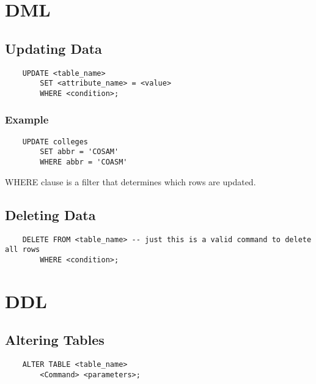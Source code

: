 \documentclass[twoside]{article}
\begin{document}
\newpage
\hfill \break 
{}

\section*{DML}
\subsection*{Updating Data}
\begin{verbatim}
    UPDATE <table_name>
        SET <attribute_name> = <value>
        WHERE <condition>;
\end{verbatim}

\subsubsection*{Example}
\begin{verbatim}
    UPDATE colleges
        SET abbr = 'COSAM'
        WHERE abbr = 'COASM'
\end{verbatim}

WHERE clause is a filter that determines which rows are updated.

\subsection*{Deleting Data}
\begin{verbatim}
    DELETE FROM <table_name> -- just this is a valid command to delete all rows
        WHERE <condition>;
\end{verbatim}

\section*{DDL}
\subsection*{Altering Tables}
\begin{verbatim}
    ALTER TABLE <table_name>
        <Command> <parameters>;
\end{verbatim}
\end{document}
